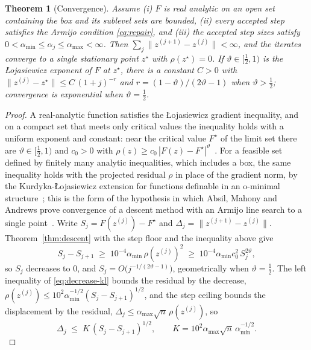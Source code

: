 \documentclass[11pt]{article}
\newtheorem{theorem}{Theorem}
\theoremstyle{definition}
\theoremstyle{remark}
\begin{document}
\begin{theorem}[Convergence]
\label{thm:convergence}
Assume (i) $F$ is real analytic on an open set containing the box and its sublevel sets are bounded,
(ii) every accepted step satisfies the Armijo condition \eqref{eq:repair}, and (iii) the accepted step
sizes satisfy $0<\alpha_{\min}\le\alpha_j\le\alpha_{\max}<\infty$. Then
$\sum_j\|z^{(j+1)}-z^{(j)}\|<\infty$, and the iterates converge to a single stationary point $z^\star$
with $\rho(z^\star)=0$. If $\vartheta\in[\tfrac12,1)$ is the {\L}ojasiewicz exponent of $F$ at
$z^\star$, there is a constant $C>0$ with
$\|z^{(j)}-z^\star\|\le C\,(1+j)^{-r}$ and $r=(1-\vartheta)/(2\vartheta-1)$ when $\vartheta>\tfrac12$;
convergence is exponential when $\vartheta=\tfrac12$.
\end{theorem}
\begin{proof}
A real-analytic function satisfies the {\L}ojasiewicz gradient inequality, and on a compact set that
meets only critical values the inequality holds with a uniform exponent and constant: near the critical
value $F^\star$ of the limit set there are $\vartheta\in[\tfrac12,1)$ and $c_0>0$ with
$\rho(z)\ge c_0\,|F(z)-F^\star|^{\vartheta}$~\cite{lojasiewicz}. For a feasible set defined by finitely
many analytic inequalities, which includes a box, the same inequality holds with the projected residual
$\rho$ in place of the gradient norm, by the Kurdyka-{\L}ojasiewicz extension for functions definable in
an o-minimal structure~\cite{bolte}; this is the form of the hypothesis in which Absil, Mahony and
Andrews prove convergence of a descent method with an Armijo line search to a single point~\cite{absil}.
Write $S_j=F(z^{(j)})-F^\star$ and $\Delta_j=\|z^{(j+1)}-z^{(j)}\|$. Theorem~\ref{thm:descent} with the
step floor and the inequality above give
\begin{equation}
S_j-S_{j+1}\;\ge\;10^{-4}\alpha_{\min}\,\rho(z^{(j)})^2\;\ge\;10^{-4}\alpha_{\min}c_0^2\,S_j^{2\vartheta},
\label{eq:decrease-kl}
\end{equation}
so $S_j$ decreases to $0$, and $S_j=O\big(j^{-1/(2\vartheta-1)}\big)$, geometrically when
$\vartheta=\tfrac12$. The left inequality of \eqref{eq:decrease-kl} bounds the residual by the
decrease, $\rho(z^{(j)})\le10^{2}\alpha_{\min}^{-1/2}(S_j-S_{j+1})^{1/2}$, and the step ceiling bounds
the displacement by the residual, $\Delta_j\le\alpha_{\max}\sqrt n\,\rho(z^{(j)})$, so
\begin{equation}
\Delta_j\;\le\;K\,(S_j-S_{j+1})^{1/2},\qquad K=10^{2}\alpha_{\max}\sqrt n\,\alpha_{\min}^{-1/2}.
\label{eq:tv-bound}

\end{equation}
\end{proof}
\end{document}
